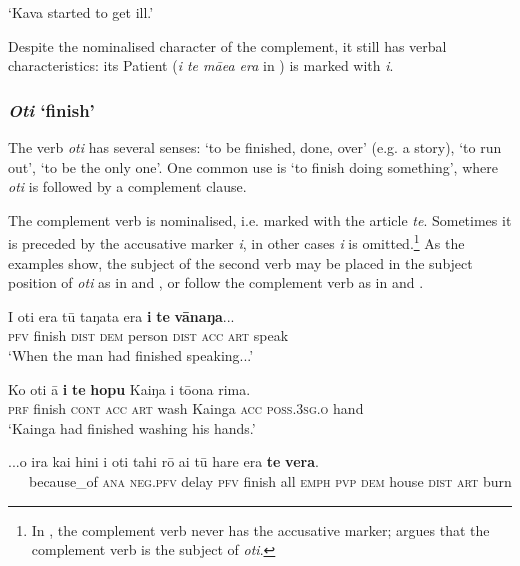 \glt
‘Kava started to get ill.’ \textstyleExampleref{[R229.224]} 
\z

Despite the nominalised character of the complement, it still has verbal characteristics: its Patient (\textit{i te mā{\ꞌ}ea era} in ) is marked with \textit{i}.
\subsubsection{\textit{Oti} ‘finish’}\label{sec:11.3.2.2}
The verb \textit{oti} has several senses: ‘to be finished, done, over’ (e.g. a story), ‘to run out’, ‘to be the only one’. One common use is ‘to finish doing something’, where \textit{oti} is followed by a complement clause.

The complement verb is nominalised, i.e. marked with the article \textit{te}. Sometimes it is preceded by the accusative marker \textit{i}, in other cases \textit{i} is omitted.\footnote{\label{fn:506}In , the complement verb never has the accusative marker; \citet{Hooper1984Unusual} argues that the complement verb is the subject of \textit{oti}.}  As the examples show, the subject of the second verb may be placed in the subject position of \textit{oti} as in  and , or follow the complement verb as in  and .

\ea\label{ex:11.50}
\gll I oti era tū taŋata era \textbf{i} \textbf{te} \textbf{vānaŋa}...\\
\textsc{pfv} finish \textsc{dist} \textsc{dem} person \textsc{dist} \textsc{acc} \textsc{art} speak\\

\glt 
‘When the man had finished speaking...’ \textstyleExampleref{[R315.377]} 
\z

\ea\label{ex:11.51}
\gll Ko oti {\ꞌ}ā \textbf{i} \textbf{te} \textbf{hopu} Kaiŋa i tō{\ꞌ}ona rima. \\
\textsc{prf} finish \textsc{cont} \textsc{acc} \textsc{art} wash Kainga \textsc{acc} \textsc{poss.3sg.o} hand \\

\glt 
‘Kainga had finished washing his hands.’ \textstyleExampleref{[R243.078]} 
\z

\ea\label{ex:11.52}
\gll ...{\ꞌ}o ira kai hini i oti tahi rō ai tū hare era \textbf{te} \textbf{vera}. \\
~~~because\_of \textsc{ana} \textsc{neg.pfv} delay \textsc{pfv} finish all \textsc{emph} \textsc{pvp} \textsc{dem} house \textsc{dist} \textsc{art} burn \\

